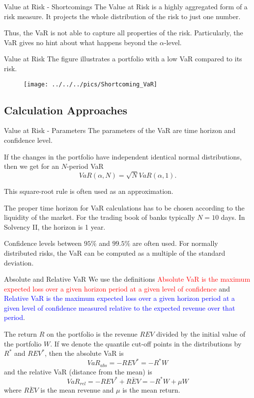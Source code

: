 Value at Risk - Shortcomings
	The Value at Risk is a highly aggregated form of a risk measure. It projects the whole distribution of the 
	risk to just one number.
	
	Thus, the VaR is not able to capture all properties of the risk. Particularly, the VaR gives no hint 
	about what happens beyond the $\alpha$-level.


Value at Risk
The figure illustrates a portfolio with a low VaR compared to its risk.
\begin{figure}
	\centering
		\texttt{[image: ../../../pics/Shortcoming\_VaR]}
	\label{fig:Shortcoming_VaR}
\end{figure}


\subsection{Calculation Approaches}

Value at Risk - Parameters
	The parameters of the VaR are time horizon and confidence level.
	
	If the changes in the portfolio have independent identical normal distributions, then we get for an $N$-period VaR
		$$
			VaR(\alpha,N) = \sqrt{N}VaR(\alpha,1).
		$$
	
	This square-root rule is often used as an approximation.
	
	The proper time horizon for VaR calculations has to be chosen
	according to the liquidity of the market. For the trading book of banks
	typically $N=10$ days. In Solvency II, the horizon is 1 year.
	
	Confidence levels between $95\%$ and $99.5\%$
	are often used. For normally distributed risks, the VaR can be computed as a
	multiple of the standard deviation.




Absolute and Relative VaR
	We use the definitions \textcolor{red}{Absolute VaR is the maximum expected loss over a given horizon period
	at a given level of confidence} and \textcolor{blue}{Relative VaR is the maximum expected loss over a given horizon period
	at a given level of confidence measured relative to the expected revenue over that period}.
	
	The return $R$ on the portfolio is the revenue $REV$ divided by the initial value of the portfolio $W$. If we denote the
	quantile cut-off points in the distributions by $R^*$ and $REV^*$, then the
	absolute VaR is 
		$$
		VaR_{abs} = -REV^* = -R^* W
		$$
	and the relative VaR (distance from the mean) is
		$$
		VaR_{rel}= -REV^*+\bar{REV}= -R^*W+\mu W
		$$
	where $\bar{REV}$ is the mean revenue and $\mu$ is the mean return.


